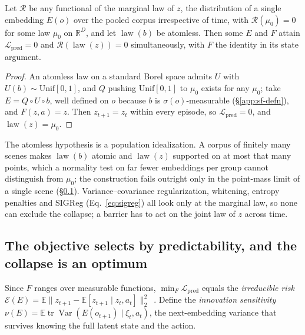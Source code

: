 \begin{proposition}[Feasibility]
\label{prop:sf-feasibility}
Let $\mathcal{R}$ be any functional of the marginal law of $z$, the distribution of a single
embedding $E(o)$ over the pooled corpus irrespective of time, with $\mathcal{R}(\mu_0) = 0$
for some law $\mu_0$ on $\mathbb{R}^D$, and let $\operatorname{law}(b)$ be atomless. Then some $E$ and $F$ attain $\mathcal{L}_{\mathrm{pred}} = 0$ and
$\mathcal{R}(\operatorname{law}(z)) = 0$ simultaneously, with $F$ the identity in its state
argument.
\end{proposition}

\begin{proof}
An atomless law on a standard Borel space admits $U$ with $U(b)\sim\mathrm{Unif}[0,1]$, and $Q$ pushing $\mathrm{Unif}[0,1]$ to $\mu_0$ exists for any $\mu_0$; take $E = Q\circ U\circ b$, well defined on $o$ because $b$ is $\sigma(o)$-measurable (\S\ref{app:sf-defn}), and $F(z,a) = z$. Then $z_{t+1} = z_t$ within every episode, so $\mathcal{L}_{\mathrm{pred}} = 0$, and $\operatorname{law}(z) = \mu_0$.
\end{proof}

The atomless hypothesis is a population idealization. A corpus of finitely many scenes makes $\operatorname{law}(b)$ atomic and $\operatorname{law}(z)$ supported on at most that many points, which a normality test on far fewer embeddings per group cannot distinguish from $\mu_0$; the construction fails outright only in the point-mass limit of a single scene (\S\ref{app:sf-optimality}). Variance--covariance regularization, whitening, entropy penalties and SIGReg (Eq.~\eqref{eq:sigreg}) all look only at the marginal law, so none can exclude the collapse; a barrier has to act on the joint law of $z$ across time.

\subsection{The objective selects by predictability, and the collapse is an optimum}
\label{app:sf-optimality}

Since $F$ ranges over measurable functions, $\min_F\mathcal{L}_{\mathrm{pred}}$ equals the
\emph{irreducible risk}
$\mathcal{E}(E) = \mathbb{E}\|z_{t+1}-\mathbb{E}[z_{t+1}\mid z_t,a_t]\|_2^2$~\citep{Weghenkel2016GraphbasedPF}. Define the \emph{innovation sensitivity}
$\nu(E) = \mathbb{E}\operatorname{tr}\operatorname{Var}(E(o_{t+1})\mid \xi_t,a_t)$, the
next-embedding variance that survives knowing the full latent state and the action.

